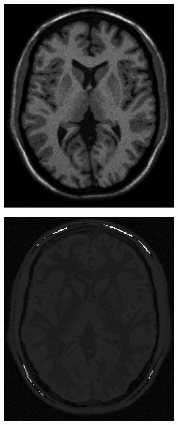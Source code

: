 \documentclass[letterpaper,12pt]{article}
\theoremstyle{plain}
\begin{document}
\begin{figure}[h]
\begin{subfigure}[h]{0.24\linewidth}
            \includegraphics[width=\textwidth]{Figuras/ImageA_exp_gamma=1.75.png}
        \end{subfigure}
        \begin{subfigure}[h]{0.24\linewidth}
            \centering
            \includegraphics[width=\textwidth]{Figuras/sustraction_exp_gamma=1.75.png}

\end{subfigure}
\end{figure}
\end{document}
